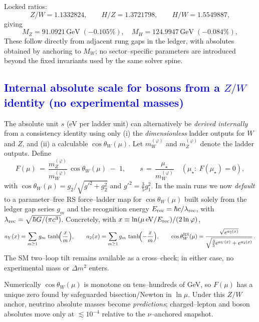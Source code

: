 \documentclass[%
 amsmath,amssymb,
 aps,
prb,
floatfix, showkeys
]{revtex4-2}
\newcommand{\modif}[1]{\textcolor{blue}{#1}}
\begin{document}
Locked ratios:
\[
Z/W=1.1332824,\qquad H/Z=1.3721798,\qquad H/W=1.5549887,
\]
giving
\[
M_Z=91.0921\,\text{GeV}\;(-0.105\%),\quad
M_H=124.9947\,\text{GeV}\;(-0.084\%),
\]
These follow directly from adjacent rung gaps in the ledger, with absolutes obtained by anchoring to $M_W$; no sector--specific parameters are introduced beyond the fixed invariants used by the same solver spine.








{\modif{
\subsection{Internal absolute scale for bosons from a $Z/W$ identity (no experimental masses)}
\label{subsec:ZW-anchor}
}}
The absolute unit $s$ (eV per ladder unit) can alternatively be \emph{derived internally} from a consistency identity using only (i) the \emph{dimensionless} ladder outputs for $W$ and $Z$, and (ii) a calculable $\cos\theta_W(\mu)$.
Let $m_W^{(\varphi)}$ and $m_Z^{(\varphi)}$ denote the ladder outputs. Define
\[
  F(\mu) \,=\, \frac{m_Z^{(\varphi)}}{m_W^{(\varphi)}}\,\cos\theta_W(\mu)\; -\; 1,\qquad
  s \,=\, \frac{\mu_\star}{m_W^{(\varphi)}}\quad(\mu_\star:\ F(\mu_\star)=0),
\]
with $\cos\theta_W(\mu)=g_2/\sqrt{g'^2+g_2^2}$ and $g'^2=\tfrac{3}{5}g_1^2$.
In the main runs we now \emph{default} to a parameter--free RS force--ladder map for $\cos\theta_W(\mu)$ built solely from the ledger gap series $g_m$ and the recognition energy $E_{\rm rec}=\hbar c/\lambda_{\rm rec}$, with $\lambda_{\rm rec}=\sqrt{\hbar G/(\pi c^3)}$. Concretely, with $x\equiv \ln(\mu\,\mathrm{eV}/E_{\rm rec})/(2\ln\varphi)$,
\[
  a_Y(x)=\sum_{m\ge1} g_m\,\tanh\!\Bigl(\frac{x}{m}\Bigr),\qquad
  a_2(x)=\sum_{m\ge1} g_m\,\tanh\!\Bigl(-\frac{x}{m}\Bigr),\qquad
  \cos\theta_W^{\rm RS}(\mu)=\frac{\sqrt{e^{a_2(x)}}}{\sqrt{\tfrac{3}{5}e^{a_Y(x)}+e^{a_2(x)}}}\,.
\]
The SM two--loop tilt remains available as a cross--check; in either case, no experimental mass or $\Delta m^2$ enters.

Numerically $\cos\theta_W(\mu)$ is monotone on tens–hundreds of GeV, so $F(\mu)$ has a unique zero found by safeguarded bisection/Newton in $\ln\mu$. Under this $Z/W$ anchor, neutrino absolute masses become \emph{predictions}; charged--lepton and boson absolutes move only at $\lesssim10^{-4}$ relative to the $\nu$--anchored snapshot.
\end{document}
